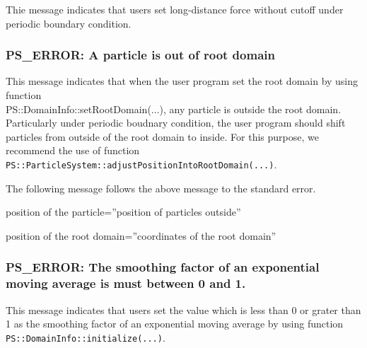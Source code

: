 Thie message indicates that users set long-distance force without
cutoff under periodic boundary condition.

\subsubsection{PS\_ERROR: A particle is out of root domain}

This message indicates that when the user program set the root domain
by using function \\ PS::DomainInfo::setRootDomain(...), any particle
is outside the root domain. Particularly under periodic boudnary
condition, the user program should shift particles from outside of the
root domain to inside. For this purpose, we recommend the use of
function
\texttt{PS::ParticleSystem::adjustPositionIntoRootDomain(...)}.

The following message follows the above message to the standard
error.

\begin{screen}
  position of the particle=''position of particles outside''

  position of the root domain=''coordinates of the root domain''
\end{screen}


\subsubsection{PS\_ERROR: The smoothing factor of an exponential moving average is must between 0 and 1.}

This message indicates that users set the value which is less than 0
or grater than 1 as the smoothing factor of an exponential moving
average by using function \\ {\tt PS::DomainInfo::initialize(...)}.

